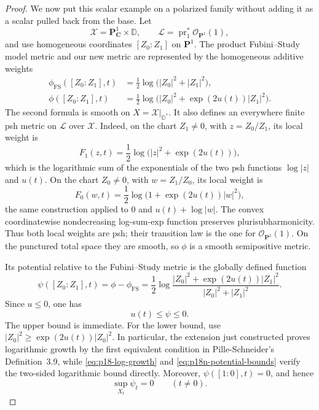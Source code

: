 \begin{proof}
We now put this scalar example on a polarized family without adding it as
a scalar pulled back from the base.  Let
\[
 \mathcal X=\mathbf P^1_{\mathbf C}\times\mathbb D,\qquad
 \mathcal L=\operatorname{pr}_1^*\mathcal O_{\mathbf P^1}(1),
\]
and use homogeneous coordinates \([Z_0:Z_1]\) on \(\mathbf P^1\).
The product Fubini--Study model metric and our new metric are represented
by the homogeneous additive weights
\[
\begin{aligned}
 \phi_{\mathrm{FS}}([Z_0:Z_1],t)
   &=\frac12\log\bigl(|Z_0|^2+|Z_1|^2\bigr),\\
 \phi([Z_0:Z_1],t)
   &=\frac12\log\bigl(|Z_0|^2+\exp(2u(t))|Z_1|^2\bigr).
\end{aligned}
\tag{11}\label{eq:p18n-metrics}
\]
The second formula is smooth on
\(X=\mathcal X|_{\mathbb D^*}\).  It also defines an everywhere finite
psh metric on \(\mathcal L\) over \(\mathcal X\).  Indeed, on the chart
\(Z_1\ne0\), with \(z=Z_0/Z_1\), its local weight is
\[
 F_1(z,t)=\frac12\log\bigl(|z|^2+\exp(2u(t))\bigr),
\tag{12}\label{eq:p18n-weight-one}
\]
which is the logarithmic sum of the exponentials of the two psh
functions \(\log|z|\) and \(u(t)\).  On the chart \(Z_0\ne0\), with
\(w=Z_1/Z_0\), its local weight is
\[
 F_0(w,t)=\frac12\log\bigl(1+\exp(2u(t))|w|^2\bigr),
\tag{13}\label{eq:p18n-weight-zero}
\]
the same construction applied to \(0\) and \(u(t)+\log|w|\).
The convex coordinatewise nondecreasing log-sum-exp function preserves
plurisubharmonicity.  Thus both local weights are psh; their transition
law is the one for \(\mathcal O_{\mathbf P^1}(1)\).  On the punctured
total space they are smooth, so \(\phi\) is a smooth semipositive metric.

Its potential relative to the Fubini--Study metric is the globally
defined function
\[
 \psi([Z_0:Z_1],t)
 =\phi-\phi_{\mathrm{FS}}
 =\frac12\log
   \frac{|Z_0|^2+\exp(2u(t))|Z_1|^2}
        {|Z_0|^2+|Z_1|^2}.
\tag{14}\label{eq:p18n-relative-potential}
\]
Since \(u\leq0\), one has
\[
                         u(t)\leq\psi\leq0.
\tag{15}\label{eq:p18n-potential-bounds}
\]
The upper bound is immediate.  For the lower bound, use
\(|Z_0|^2\geq\exp(2u(t))|Z_0|^2\).  In particular, the extension just
constructed proves logarithmic growth by the first equivalent condition
in Pille-Schneider's Definition~3.9, while
\eqref{eq:p18-log-growth} and \eqref{eq:p18n-potential-bounds} verify
the two-sided logarithmic bound directly.  Moreover,
\(\psi([1:0],t)=0\), and hence
\[
                   \sup_{X_t}\psi_t=0\qquad(t\ne0).
\tag{16}\label{eq:p18n-complex-normalization}
\]


\end{proof}
